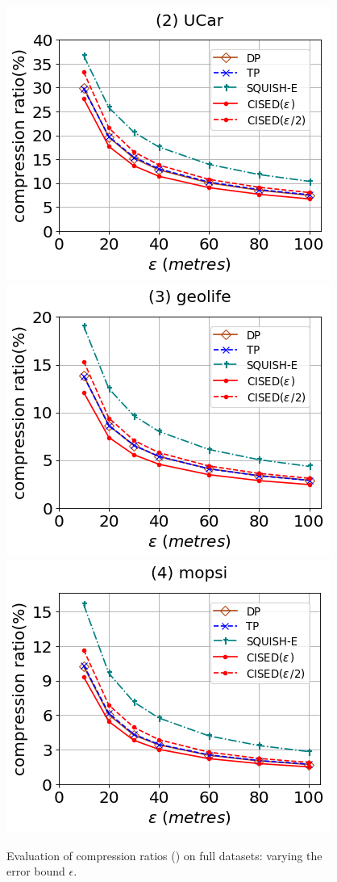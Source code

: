 \begin{figure}[tb!]
	\centering
	\includegraphics[scale=0.320]{Figures/Exp-SED-CR-epsilon-service.png} 	\hspace{3ex}
	\includegraphics[scale=0.320]{Figures/Exp-SED-CR-epsilon-geolife.png}	\hspace{3ex}
	\includegraphics[scale=0.320]{Figures/Exp-SED-CR-epsilon-mopsi.png}		
	\vspace{-2ex}
	\caption{\small Evaluation of compression ratios (\sed) on full datasets: varying the error bound $\epsilon$.}
	\label{fig:cr-sed-epsilon}
	\vspace{-2ex}
\end{figure}

